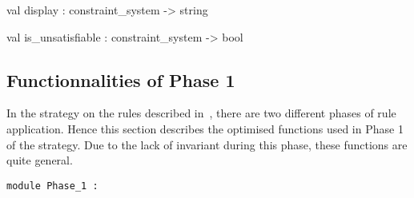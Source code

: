 \label{val:Constraint-underscoresystem.display}\begin{ocamldoccode}
val display : constraint_system -> string
\end{ocamldoccode}




\label{val:Constraint-underscoresystem.is-underscoreunsatisfiable}\begin{ocamldoccode}
val is_unsatisfiable : constraint_system -> bool
\end{ocamldoccode}




\subsection{Functionnalities of Phase 1}




In the strategy on the rules described in~,  there are two different phases
    of rule application. Hence this section describes the optimised functions used in Phase 1
    of the strategy. Due to the lack of invariant during this phase, these functions are 
    quite general.



\begin{ocamldoccode}
{\tt{module }}{\tt{Phase\_1}}{\tt{ : }}\end{ocamldoccode}
\label{module:Constraint-underscoresystem.Phase-underscore1}

